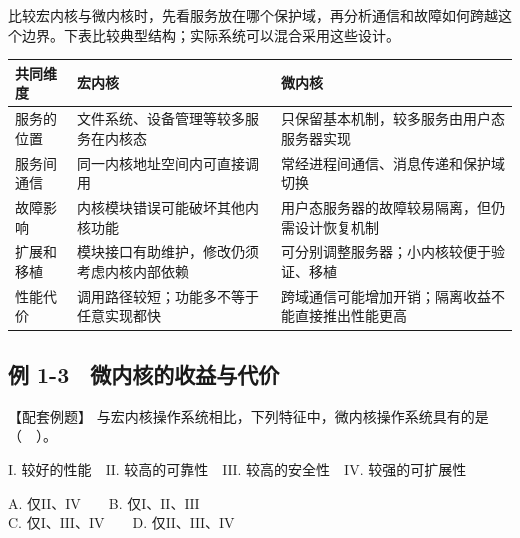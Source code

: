 比较宏内核与微内核时，先看服务放在哪个保护域，再分析通信和故障如何跨越这个边界。下表比较典型结构；实际系统可以混合采用这些设计。

\begin{wideblock}

\par\medskip\noindent\begin{minipage}{\linewidth}\fontsize{9.3}{12}\selectfont\begin{tabularx}{\linewidth}{@{}YYY@{}}
\toprule\noalign{}
\begin{minipage}[b]{\linewidth}\raggedright
共同维度
\end{minipage} & \begin{minipage}[b]{\linewidth}\raggedright
宏内核
\end{minipage} & \begin{minipage}[b]{\linewidth}\raggedright
微内核
\end{minipage} \\
\midrule\noalign{}


服务的位置 & 文件系统、设备管理等较多服务在内核态 & 只保留基本机制，较多服务由用户态服务器实现 \\
服务间通信 & 同一内核地址空间内可直接调用 & 常经进程间通信、消息传递和保护域切换 \\
故障影响 & 内核模块错误可能破坏其他内核功能 & 用户态服务器的故障较易隔离，但仍需设计恢复机制 \\
扩展和移植 & 模块接口有助维护，修改仍须考虑内核内部依赖 & 可分别调整服务器；小内核较便于验证、移植 \\
性能代价 & 调用路径较短；功能多不等于任意实现都快 & 跨域通信可能增加开销；隔离收益不能直接推出性能更高 \\
\bottomrule\end{tabularx}
\end{minipage}\par\medskip

\end{wideblock}

\subsection{例 1-3　微内核的收益与代价}\label{OS01-ex1-3}

{\begin{example}[配套例题]

【配套例题】 与宏内核操作系统相比，下列特征中，微内核操作系统具有的是（　）。

\ensuremath{\mathrm{I}}. 较好的性能　\ensuremath{\mathrm{II}}. 较高的可靠性　\ensuremath{\mathrm{III}}. 较高的安全性　\ensuremath{\mathrm{IV}}. 较强的可扩展性

A. 仅\ensuremath{\mathrm{II}}、\ensuremath{\mathrm{IV}}　　B. 仅\ensuremath{\mathrm{I}}、\ensuremath{\mathrm{II}}、\ensuremath{\mathrm{III}}\\
C. 仅\ensuremath{\mathrm{I}}、\ensuremath{\mathrm{III}}、\ensuremath{\mathrm{IV}}　　D. 仅\ensuremath{\mathrm{II}}、\ensuremath{\mathrm{III}}、\ensuremath{\mathrm{IV}}

\end{example}}

